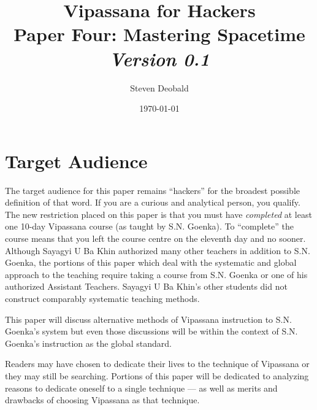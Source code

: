 \documentclass[a4paper, amsfonts, amssymb, amsmath, reprint, showkeys, nofootinbib, twoside]{revtex4-1}
\begin{document}
\title{%
  \large{Vipassana for Hackers} \\
  \Huge{Paper Four: Mastering Spacetime} \\
  \large\textit{Version 0.1}
}
\author{Steven Deobald}
\date{\today}

\begin{abstract}
\end{abstract}


\maketitle

\section{Target Audience}

The target audience for this paper remains ``hackers'' for the broadest possible
definition of that word.  If you are a curious and
analytical person, you qualify. The new restriction placed on this paper is that you
must have \textit{completed} at least one 10-day Vipassana course (as taught by
S.N. Goenka). To ``complete'' the course means that you left the course centre on the
eleventh day and no sooner. Although Sayagyi U Ba Khin authorized many other teachers
in addition to S.N. Goenka, the portions of this paper which deal with the systematic
and global approach to the teaching require taking a course from S.N. Goenka or one
of his authorized Assistant Teachers. Sayagyi U Ba Khin's other students did not
construct comparably systematic teaching methods.

This paper will discuss alternative methods of Vipassana instruction to S.N. Goenka's
system but even those discussions will be within the context of S.N. Goenka's
instruction as the global standard.

Readers may have chosen to dedicate their lives to the technique of Vipassana or they
may still be searching. Portions of this paper will be dedicated to analyzing reasons
to dedicate oneself to a single technique --- as well as merits and drawbacks of
choosing Vipassana as that technique.
\end{document}
